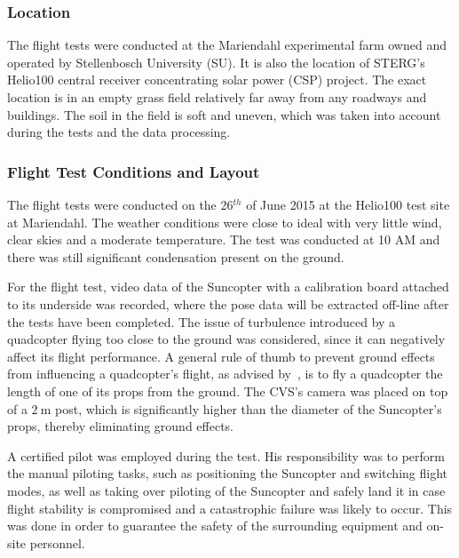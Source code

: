 \subsubsection{Location}

The flight tests were conducted at the Mariendahl experimental farm owned and operated by Stellenbosch University (SU). It is also the location of STERG's Helio100 central receiver concentrating solar power (CSP) project. The exact location is in an empty grass field relatively far away from any roadways and buildings. The soil in the field is soft and uneven, which was taken into account during the tests and the data processing. 

\subsubsection{Flight Test Conditions and Layout}

The flight tests were conducted on the 26$^{th}$ of June 2015 at the Helio100 test site at Mariendahl. The weather conditions were close to ideal with very little wind, clear skies and a moderate temperature. The test was conducted at 10 AM and there was still significant condensation present on the ground. %

For the flight test, video data of the Suncopter with a calibration board attached to its underside was recorded, where the pose data will be extracted off-line after the tests have been completed. The issue of turbulence introduced by a quadcopter flying too close to the ground was considered, since it can negatively affect its flight performance. A general rule of thumb to prevent ground effects from influencing a quadcopter's flight, as advised by~\cite{basson-flight-test}, is to fly a quadcopter the length of one of its props from the ground. The CVS's camera was placed on top of a $\SI{2}{\m}$ post, which is significantly higher than the diameter of the Suncopter's props, thereby eliminating ground effects.

A certified pilot was employed during the test. His responsibility was to perform the manual piloting tasks, such as positioning the Suncopter and switching flight modes, as well as taking over piloting of the Suncopter and safely land it in case flight stability is compromised and a catastrophic failure was likely to occur. This was done in order to guarantee the safety of the surrounding equipment and on-site personnel. 

